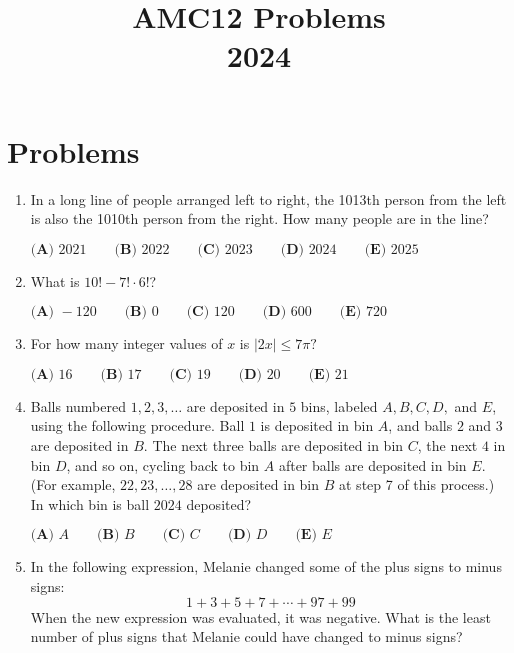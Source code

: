 \documentclass{article}
\title{AMC12 Problems \\ 2024}
\date{}
\begin{document}
\maketitle\thispagestyle{fancy}\newpage\section*{Problems}\begin{enumerate}[label=\arabic*., itemsep=0.5em]\item In a long line of people arranged left to right, the 1013th person from the left is also the 1010th person from the right. How many people are in the line?

\(\textbf{(A) } 2021 \qquad\textbf{(B) } 2022 \qquad\textbf{(C) } 2023 \qquad\textbf{(D) } 2024 \qquad\textbf{(E) } 2025\)\par \vspace{0.5em}\item What is \(10! - 7! \cdot 6!\)?

\(\textbf{(A) }-120 \qquad\textbf{(B) }0 \qquad\textbf{(C) }120 \qquad\textbf{(D) }600 \qquad\textbf{(E) }720 \qquad\)\par \vspace{0.5em}\item For how many integer values of \(x\) is \(|2x|\leq 7\pi?\)

\(\textbf{(A) }16 \qquad\textbf{(B) }17\qquad\textbf{(C) }19\qquad\textbf{(D) }20\qquad\textbf{(E) }21\)\par \vspace{0.5em}\item Balls numbered \(1,2,3,\ldots\) are deposited in \(5\) bins, labeled \(A,B,C,D,\) and \(E\), using the following procedure. Ball \(1\) is deposited in bin \(A\), and balls \(2\) and \(3\) are deposited in \(B\). The next three balls are deposited in bin \(C\), the next \(4\) in bin \(D\), and so on, cycling back to bin \(A\) after balls are deposited in bin \(E\). (For example, \(22,23,\ldots,28\) are deposited in bin \(B\) at step 7 of this process.) In which bin is ball \(2024\) deposited?

\(\textbf{(A) }A\qquad\textbf{(B) }B\qquad\textbf{(C) }C\qquad\textbf{(D) }D\qquad\textbf{(E) }E\)\par \vspace{0.5em}\item In the following expression, Melanie changed some of the plus signs to minus signs:
\begin{equation*}
1 + 3+5+7+\cdots+97+99
\end{equation*}
When the new expression was evaluated, it was negative. What is the least number of plus signs that Melanie could have changed to minus signs?


\end{enumerate}
\end{document}
